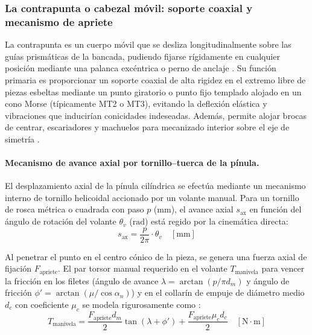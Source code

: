 \documentclass[12pt,a4paper]{article}
\begin{document}
\subsubsection{La contrapunta o cabezal móvil: soporte coaxial y mecanismo de apriete}
La contrapunta es un cuerpo móvil que se desliza longitudinalmente sobre las guías prismáticas de la bancada, pudiendo fijarse rígidamente en cualquier posición mediante una palanca excéntrica o perno de anclaje \cite{quintero2018}. Su función primaria es proporcionar un soporte coaxial de alta rigidez en el extremo libre de piezas esbeltas mediante un punto giratorio o punto fijo templado alojado en un cono Morse (típicamente MT2 o MT3), evitando la deflexión elástica y vibraciones que inducirían conicidades indeseadas. Además, permite alojar brocas de centrar, escariadores y machuelos para mecanizado interior sobre el eje de simetría \cite{kalpakjian2020, altintas2012}.

\paragraph{Mecanismo de avance axial por tornillo--tuerca de la pínula.}
El desplazamiento axial de la pínula cilíndrica se efectúa mediante un mecanismo interno de tornillo helicoidal accionado por un volante manual. Para un tornillo de rosca métrica o cuadrada con paso $p$ ($\si{\milli\meter}$), el avance axial $s_{\text{ax}}$ en función del ángulo de rotación del volante $\theta_v$ ($\si{\radian}$) está regido por la cinemática directa:
\begin{equation}
    s_{\text{ax}} = \frac{p}{2\pi} \cdot \theta_v \quad [\si{\milli\meter}]
    \label{eq:avance_pinula}
\end{equation}

Al penetrar el punto en el centro cónico de la pieza, se genera una fuerza axial de fijación $F_{\text{apriete}}$. El par torsor manual requerido en el volante $T_{\text{manivela}}$ para vencer la fricción en los filetes (ángulo de avance $\lambda = \arctan(p / \pi d_m)$ y ángulo de fricción $\phi' = \arctan(\mu / \cos \alpha_n)$) y en el collarín de empuje de diámetro medio $d_c$ con coeficiente $\mu_c$ se modela rigurosamente como \cite{shigley2020}:
\begin{equation}
    T_{\text{manivela}} = \frac{F_{\text{apriete}} d_m}{2} \tan(\lambda + \phi') + \frac{F_{\text{apriete}} \mu_c d_c}{2} \quad [\si{\newton\cdot\meter}]
    \label{eq:par_contrapunta}
\end{equation}
\end{document}
